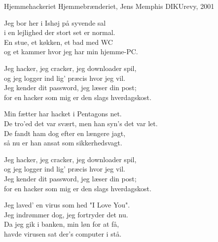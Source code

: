\begin{song}{Hjemmehackeriet}
  {} %
  {Hjemmebrænderiet, Jens Memphis} %
  {} %
  {DIKUrevy, 2001} %
  {\NotCCLIed} %

  \begin{SBVerse}
    Jeg bor her i Ishøj på syvende sal\\
    i en lejlighed der stort set er normal.\\
    En stue, et køkken, et bad med WC\\
    og et kammer hvor jeg har min hjemme-PC.
  \end{SBVerse}

  \begin{SBChorus}
    Jeg hacker, jeg cracker, jeg downloader spil,\\
    og jeg logger ind lig' præcis hvor jeg vil.\\
    Jeg kender dit password, jeg læser din post;\\
    for en hacker som mig er den slags hverdagskost.
  \end{SBChorus}

  \begin{SBVerse}
    Min fætter har hacket i Pentagons net.\\
    De tro'ed det var svært, men han syn's det var let.\\
    De fandt ham dog efter en længere jagt,\\
    så nu er han ansat som sikkerhedsvagt.
  \end{SBVerse}

  \begin{SBChorus}
    Jeg hacker, jeg cracker, jeg downloader spil,\\
    og jeg logger ind lig' præcis hvor jeg vil.\\
    Jeg kender dit password, jeg læser din post;\\
    for en hacker som mig er den slags hverdagskost.
  \end{SBChorus}


  \begin{SBVerse}
    Jeg laved' en virus som hed "I Love You".\\
    Jeg indrømmer dog, jeg fortryder det nu.\\
    Da jeg gik i banken, min løn for at få,\\
    havde virusen sat der's computer i stå.
  \end{SBVerse}


\end{song}
